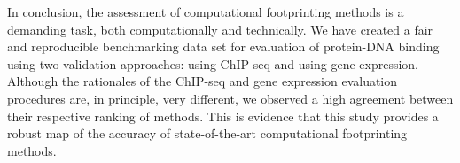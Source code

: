 In conclusion, the assessment of computational footprinting methods is a demanding task, both computationally and technically. We have created a fair and reproducible benchmarking data set for evaluation of protein-DNA binding using two validation approaches: using ChIP-seq and using gene expression. Although the rationales of the ChIP-seq and gene expression evaluation procedures are, in principle, very different, we observed a high agreement between their respective ranking of methods. This is evidence that this study provides a robust map of the accuracy of state-of-the-art computational footprinting methods.


